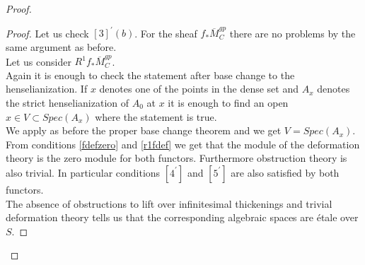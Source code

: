 \documentclass{amsart}
\theoremstyle{definition}
\numberwithin{equation}{section}
\begin{document}
\begin{proof}
\begin{proof}
\noindent Let us check $[3]^{\prime}(b)$. 
For the sheaf $f_{*}\overline{M}_C^{gp}$ there are no problems by the same argument as before.\\
Let us consider $R^1f_{*}\overline{M}_C^{gp}$.\\
Again it is enough to check the statement after base change to the henselianization. If $x$ denotes one of the points in the dense set and $A_x$ denotes the strict henselianization of $A_0$ at $x$ it is enough to find an open $x\in V\subset Spec(A_x)$ where the statement is true.\\
We apply as before the proper base change theorem and we get $V=Spec(A_x)$.\\

\noindent From conditions \ref{fdefzero} and \ref{r1fdef} we get that the module of the deformation theory is the zero module for both functors. Furthermore obstruction theory is also trivial. In particular conditions $[4^{\prime}]$ and $[5^{\prime}]$ are also satisfied by both functors.\\
The absence of obstructions to lift over infinitesimal thickenings and trivial deformation theory tells us that the corresponding algebraic spaces are \'etale over $S$.
\end{proof}


\end{proof}
\end{document}
